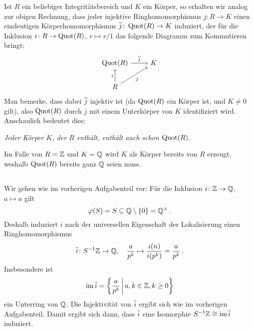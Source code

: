 \begin{remark}
  Ist $R$ ein beliebiger Integritätsbereich und $K$ ein Körper, so erhalten wir analog zur obigen Rechnung, dass jeder injektive Ringhomomorphismus $j \colon R \to K$ einen eindeutigen Körperhomomorphismus $\overline{j} \colon \operatorname{Quot}(R) \to K$ induziert, der für die Inklusion $i \colon R \to \operatorname{Quot}(R)$, $r \mapsto r/1$ das folgende Diagramm zum Kommutieren bringt:
  \[
    \begin{tikzcd}
        \Quot{R}
        \arrow{r}{\induced{j}}
      & K
      \\
        R
        \arrow{u}{i}
        \arrow[swap]{ur}{j}
      & {}
    \end{tikzcd}
  \]
  Man bemerke, dass dabei $\overline{j}$ injektiv ist (da $\operatorname{Quot}(R)$ ein Körper ist, und $K \neq 0$ gilt), also $\operatorname{Quot}(R)$ durch $\overline{j}$ mit einem Unterkörper von $K$ identifiziert wird.
  Anschaulich bedeutet dies:
  \begin{center}
    \emph{Jeder Körper $K$, der $R$ enthält, enthält auch schon $\operatorname{Quot}(R)$.}
  \end{center}
  Im Falle von $R = \mathbb{Z}$ und $K = \mathbb{Q}$ wird $K$ als Körper bereits von $R$ erzeugt, weshalb $\operatorname{Quot}(R)$ bereits ganz $\mathbb{Q}$ seien muss.
\end{remark}





\subsection{}

Wir gehen wie im vorherigen Aufgabenteil vor:
Für die Inklusion $i \colon \mathbb{Z} \to \mathbb{Q}$, $a \mapsto a$ gilt
\[
            \varphi(S)
  =         S
  \subseteq \mathbb{Q} \setminus \{0\}
  =         \mathbb{Q}^\times \,.
\]
Deshalb induziert $i$ nach der universellen Eigenschaft der Lokalisierung einen Ringhomomorphismus
\[
          \overline{i}
  \colon  S^{-1} \mathbb{Z}
  \to     \mathbb{Q},
  \quad   \frac{a}{p^k}
  \mapsto \frac{i(n)}{i(p^k)}
  =       \frac{a}{p^k} \,.
\]
Insbesondere ist
\[
    \im \induced{i}
  = \left\{
      \frac{a}{p^k}
    \suchthat*
      a, k \in \Integer,
      k \geq 0
    \right\}
\]
ein Unterring von $\mathbb{Q}$.
Die Injektivität von $\overline{i}$ ergibt sich wie im vorherigen Aufgabenteil.
Damit ergibt sich dann, dass $\overline{i}$ eine Isomorphie $S^{-1} \mathbb{Z} \cong \operatorname{im} \overline{i}$ induziert.

